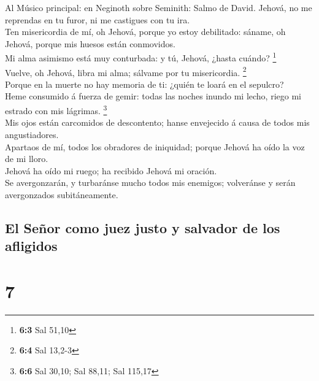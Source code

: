  Al Músico principal: en Neginoth sobre Seminith: Salmo de
David. Jehová, no me reprendas en tu furor, ni me castigues con tu
ira.\\
 Ten misericordia de mí, oh Jehová, porque yo estoy
debilitado: sáname, oh Jehová, porque mis huesos están conmovidos.\\
 Mi alma asimismo está muy conturbada: y tú, Jehová,
¿hasta cuándo? \footnote{\textbf{6:3} Sal 51,10}\\
 Vuelve, oh Jehová, libra mi alma; sálvame por tu
misericordia. \footnote{\textbf{6:4} Sal 13,2-3}\\
 Porque en la muerte no hay memoria de ti: ¿quién te loará
en el sepulcro?\\
 Heme consumido á fuerza de gemir: todas las noches inundo
mi lecho, riego mi estrado con mis lágrimas. \footnote{\textbf{6:6} Sal
  30,10; Sal 88,11; Sal 115,17}\\
 Mis ojos están carcomidos de descontento; hanse
envejecido á causa de todos mis angustiadores.\\
 Apartaos de mí, todos los obradores de iniquidad; porque
Jehová ha oído la voz de mi lloro.\\
 Jehová ha oído mi ruego; ha recibido Jehová mi oración.\\
 Se avergonzarán, y turbaránse mucho todos mis enemigos;
volveránse y serán avergonzados subitáneamente.

\hypertarget{el-seuxf1or-como-juez-justo-y-salvador-de-los-afligidos}{%
\subsection{El Señor como juez justo y salvador de los
afligidos}\label{el-seuxf1or-como-juez-justo-y-salvador-de-los-afligidos}}

\hypertarget{section-6}{%
\section{7}\label{section-6}}

